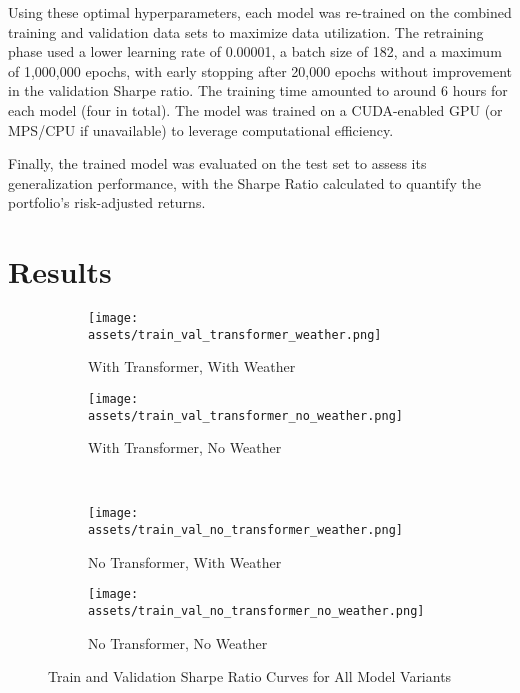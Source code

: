 \documentclass[12pt]{article}
\begin{document}
Using these optimal hyperparameters, each model was re-trained on the combined training and validation data sets to maximize data utilization. The retraining phase used a lower learning rate of 0.00001, a batch size of 182, and a maximum of 1,000,000 epochs, with early stopping after 20,000 epochs without improvement in the validation Sharpe ratio. The training time amounted to around 6 hours for each model (four in total). The model was trained on a CUDA-enabled GPU (or MPS/CPU if unavailable) to leverage computational efficiency.


Finally, the trained model was evaluated on the test set to assess its generalization performance, with the Sharpe Ratio calculated to quantify the portfolio's risk-adjusted returns.


\clearpage




\section{Results}

\begin{figure}[htbp]
    \centering
    \begin{subfigure}[b]{0.45\textwidth}
        \texttt{[image: assets/train\_val\_transformer\_weather.png]}
        \caption{With Transformer, With Weather}
    \end{subfigure}
    \begin{subfigure}[b]{0.45\textwidth}
        \texttt{[image: assets/train\_val\_transformer\_no\_weather.png]}
        \caption{With Transformer, No Weather}
    \end{subfigure}
    \\
    \begin{subfigure}[b]{0.45\textwidth}
        \texttt{[image: assets/train\_val\_no\_transformer\_weather.png]}
        \caption{No Transformer, With Weather}
    \end{subfigure}
    \begin{subfigure}[b]{0.45\textwidth}
        \texttt{[image: assets/train\_val\_no\_transformer\_no\_weather.png]}
        \caption{No Transformer, No Weather}
    \end{subfigure}
    \caption{Train and Validation Sharpe Ratio Curves for All Model Variants}
    \label{fig:sharpe_grid}
\end{figure}
\end{document}

